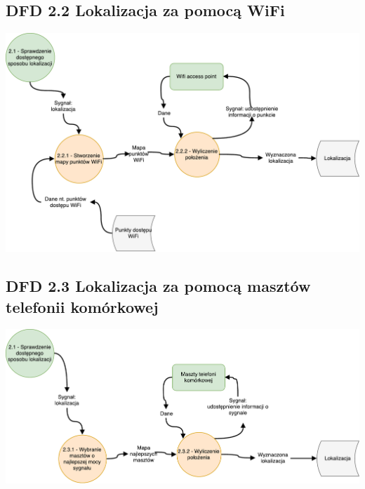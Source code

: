 \documentclass[11pt]{article}
\begin{document}
	\subsection{DFD 2.2 Lokalizacja za pomocą WiFi}
	\begin{center}
		\includegraphics[scale=0.6]{DFD22.pdf}
	\end{center}
	\newpage
	\subsection{DFD 2.3 Lokalizacja za pomocą masztów telefonii komórkowej}
	\begin{center}
		\includegraphics[scale=0.65]{DFD23.pdf}
	\end{center}
\end{document}
